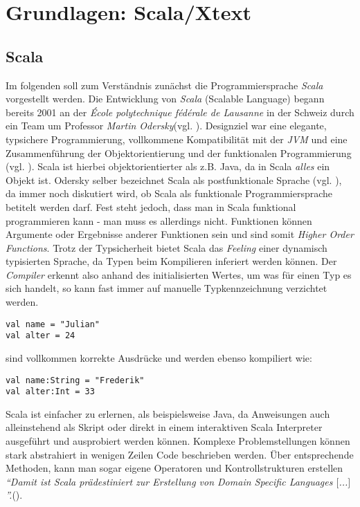 \chapter{Grundlagen: Scala/Xtext}
\section{Scala}
Im folgenden soll zum Verständnis zunächst die Programmiersprache \textit{Scala} vorgestellt werden.
Die Entwicklung von \textit{Scala} (Scalable Language) begann bereits 2001 an der\textit{ École polytechnique fédérale de Lausanne} in der Schweiz durch ein Team um Professor \textit{Martin Odersky}(vgl. ). Designziel war eine elegante, typsichere Programmierung, vollkommene Kompatibilität mit der \textit{JVM} und eine Zusammenführung der Objektorientierung und der funktionalen Programmierung (vgl. ). Scala ist hierbei objektorientierter als z.B. Java, da in Scala \textit{alles} ein Objekt ist. Odersky selber bezeichnet Scala als postfunktionale Sprache (vgl. ), da immer noch diskutiert wird, ob Scala als funktionale Programmiersprache betitelt werden darf. Fest steht jedoch, dass man in Scala funktional programmieren kann - man muss es allerdings nicht. Funktionen können Argumente oder Ergebnisse anderer Funktionen sein und sind somit \textit{Higher Order Functions}. Trotz der Typsicherheit bietet Scala das \textit{Feeling} einer dynamisch typisierten Sprache, da Typen beim Kompilieren inferiert werden können. Der \textit{Compiler} erkennt also anhand des initialisierten Wertes, um was für einen Typ es sich handelt, so kann fast immer auf manuelle Typkennzeichnung verzichtet werden.
\begin{lstlisting}[style = scala]
val name = "Julian"
val alter = 24
\end{lstlisting}
sind vollkommen korrekte Ausdrücke und werden ebenso kompiliert wie:
\begin{lstlisting}[style = scala]
val name:String = "Frederik"
val alter:Int = 33
\end{lstlisting}
Scala ist einfacher zu erlernen, als beispielsweise Java, da Anweisungen auch alleinstehend als Skript oder direkt in einem interaktiven Scala Interpreter ausgeführt und ausprobiert werden können. 
Komplexe Problemstellungen können stark abstrahiert in wenigen Zeilen Code beschrieben werden. Über entsprechende Methoden, kann man sogar eigene Operatoren und Kontrollstrukturen erstellen \textit{"`Damit ist Scala prädestiniert zur Erstellung von Domain Specific Languages $[$...$]$"'.}().
